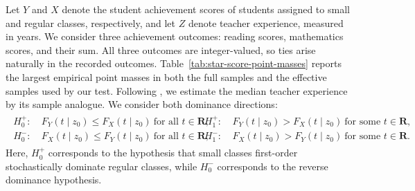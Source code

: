 \documentclass[11pt]{article}
\numberwithin{equation}{section}
\begin{document}
Let $Y$ and $X$ denote the student achievement scores of students assigned to small and regular classes, respectively, and let $Z$ denote teacher experience, measured in years. We consider three achievement outcomes: reading scores, mathematics scores, and their sum. All three outcomes are integer-valued, so ties arise naturally in the recorded outcomes. Table~\ref{tab:star-score-point-masses} reports the largest empirical point masses in both the full samples and the effective samples used by our test. Following \citet{qu/yoon:2015}, we estimate the median teacher experience by its sample analogue. We consider both dominance directions:
\begin{align}\label{eq:empApplication2}
\begin{aligned}
H_0^{+}:&\ F_Y(t\mid z_0)\le F_X(t\mid z_0)\ \text{for all }t\in\mathbf R,
&
H_1^{+}:&\ F_Y(t\mid z_0)>F_X(t\mid z_0)\ \text{for some }t\in\mathbf R,\\
H_0^{-}:&\ F_X(t\mid z_0)\le F_Y(t\mid z_0)\ \text{for all }t\in\mathbf R,
&
H_1^{-}:&\ F_X(t\mid z_0)>F_Y(t\mid z_0)\ \text{for some }t\in\mathbf R.
\end{aligned}
\end{align}
Here, $H_0^{+}$ corresponds to the hypothesis that small classes first-order stochastically dominate regular classes, while $H_0^{-}$ corresponds to the reverse dominance hypothesis.
\end{document}

